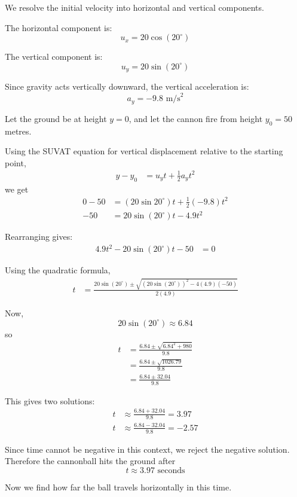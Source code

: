\begin{solution}
We resolve the initial velocity into horizontal and vertical components.

The horizontal component is:
\[
u_x = 20\cos(20^\circ)
\]

The vertical component is:
\[
u_y = 20\sin(20^\circ)
\]

Since gravity acts vertically downward, the vertical acceleration is:
\[
a_y = -9.8 \text{ m/s}^2
\]

Let the ground be at height $y = 0$, and let the cannon fire from height $y_0 = 50$ metres.

Using the SUVAT equation for vertical displacement relative to the starting point,
\begin{align*}
    y - y_0 &= u_y t + \frac{1}{2}a_y t^2
\end{align*}
we get
\begin{align*}
    0 - 50 &= (20\sin 20^\circ)t + \frac{1}{2}(-9.8)t^2 \\
    -50 &= 20\sin(20^\circ)t - 4.9t^2
\end{align*}

Rearranging gives:
\begin{align*}
    4.9t^2 - 20\sin(20^\circ)t - 50 &= 0
\end{align*}

Using the quadratic formula,
\begin{align*}
    t &= \frac{20\sin(20^\circ) \pm \sqrt{(20\sin(20^\circ))^2 - 4(4.9)(-50)}}{2(4.9)}
\end{align*}

Now,
\[
20\sin(20^\circ) \approx 6.84
\]
so
\begin{align*}
    t &= \frac{6.84 \pm \sqrt{6.84^2 + 980}}{9.8} \\
    &= \frac{6.84 \pm \sqrt{1026.79}}{9.8} \\
    &= \frac{6.84 \pm 32.04}{9.8}
\end{align*}

This gives two solutions:
\begin{align*}
    t &\approx \frac{6.84 + 32.04}{9.8} = 3.97 \\
    t &\approx \frac{6.84 - 32.04}{9.8} = -2.57
\end{align*}

Since time cannot be negative in this context, we reject the negative solution. Therefore the cannonball hits the ground after
\[
t \approx 3.97 \text{ seconds}
\]

Now we find how far the ball travels horizontally in this time.


\end{solution}
